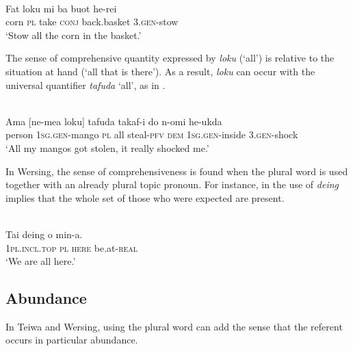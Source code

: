 \ea%
\label{ex:9:70}
 \\
\gll  Fat loku mi ba buot he-rei \\
    corn \textsc{pl} take \textsc{conj} back.basket \textsc{3.gen-}stow \\
\glt `Stow all the corn in the basket.'
\z






The sense of comprehensive quantity expressed by \textit{loku} (`all') is relative to the situation at hand (`all that is there'). As a result, \textit{loku} can occur with the universal quantifier \textit{tafuda} `all', as in .



\ea%
\label{ex:9:71}
 \\
\gll  Ama [ne-mea loku] tafuda takaf-i  do n-omi he-ukda \\
    person \textsc{1sg.gen-}mango \textsc{pl} all steal-\textsc{pfv}  \textsc{dem} \textsc{1sg.gen-}inside 3.\textsc{gen-}shock \\
\glt `All my mangos got stolen,  it really shocked me.' %
\z












In Wersing, the sense of comprehensiveness is found when the plural word is used together with an already plural topic pronoun. For instance, in  the use of \textit{deing} implies that the whole set of those who were expected are present.


\ea%
\label{ex:9:72}
 \\
\gll Tai deing o min-a.  \\
   \textsc{1pl.incl.top} \textsc{pl}   \textsc{here} be.at-\textsc{real}  \\
\glt `We are all here.'
\z






\subsection{Abundance} %
\label{sec:9:4.2}
In Teiwa and Wersing, using the plural word can add the sense that the referent occurs in particular abundance.


